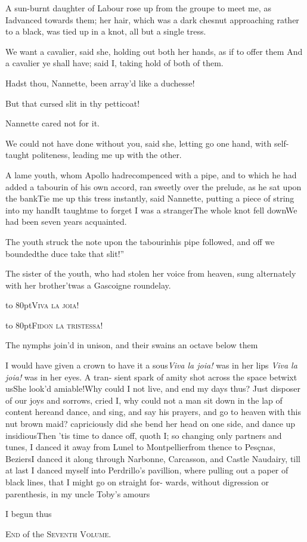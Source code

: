 \documentclass{article}
\begin{document}
A sun-burnt daughter of Labour rose up from the groupe to meet
me, as I\break advanced towards them; her hair, which was a dark chesnut
approaching rather to a black, was tied up in a knot, all but a
single tress.

We want a cavalier, said she, holding out both her hands, as if
to offer them\tsk\pb
And a cavalier ye shall have; said I, taking
hold of both of them.

Hadst thou, Nannette, been array’d like a
duchesse!

\tsh But that cursed slit in thy petticoat!

Nannette cared not for it.

We could not have done without you, said she, letting go one
hand, with self-taught politeness, leading me up with the
other.

A lame youth, whom Apollo had\break recompenced with a pipe, and
to which he had added a tabourin of his own accord, ran sweetly
over the prelude, as he sat upon the bank\tsh Tie me up this
tress instantly, said Nannette, putting a piece of string into
my hand\tsk It taught\pb me to forget I was a stranger\tsh The
whole knot fell down\tsh We had been seven years acquainted.

The youth struck the note upon the tabourin\tsk his pipe
followed, and off we bounded\tsh \lqq the duce
take that slit!”

The sister of the youth, who had stolen her voice from heaven,
sung alternately with her brother\tsh ’twas a
Gascoigne roundelay.

\centerline{\hbox to 80pt{\textsc{Viva la joia}!\hss}}
\centerline{\hbox to 80pt{\textsc{Fidon la tristessa}!\hss}}

\vskip-10pt

\noindent
The nymphs join’d in unison, and their swains an octave below them\tsh

I would have given a crown to have it\break
{}\break
a sous\tsk \textit{Viva la joia!} was in her lips\tsk\break
\textit{Viva la joia!} was in her eyes. A tran-\pb 
sient spark of amity shot across the space betwixt us\tsh She
look’d amiable!\tsh Why could I not live, and end my days thus?
Just disposer of our joys and sorrows, cried I, why could not a
man sit down in the lap of content here\tsh and dance, and sing,
and say his prayers, and go to heaven with this nut brown maid?
capriciously did she bend her head on one side, and dance up
insidious\tsh\break Then ’tis time to dance off, quoth I; so changing
only partners and tunes, I danced it away from Lunel to
Montpellier\tsh from thence to Pesçnas, Beziers\tsh I danced it
along through Narbonne, Carcasson, and Castle Naudairy, till at
last I danced myself into Perdrillo’s pavillion, where pulling
out a paper of black lines, that I might go on straight for-\pb
wards, without digression or parenthesis, in my uncle Toby’s
amours\tsh

I begun thus\tsh

\vskip 140pt

\centerline{\textsc{End} of the \textsc{Seventh Volume}.}
\end{document}
